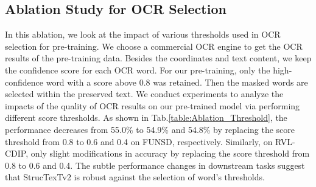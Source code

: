 \documentclass{article} \usepackage{iclr2023_conference,times}
\begin{document}
\begin{table}[ht]
\caption{Ablation study for Different Image Resolution.}
\label{table:Ablation_ImageResolution}
\vspace{-0.5em}
\begin{center}
\end{center}
\vspace{-0.5em}
\end{table}


\subsection{Ablation Study for OCR Selection}
In this ablation, we look at the impact of various thresholds used in OCR selection for pre-training. We choose a commercial OCR engine to get the OCR results of the pre-training data. Besides the coordinates and text content, we keep the confidence score for each OCR word. For our pre-training, only the high-confidence word with a score above 0.8 was retained. Then the masked words are selected within the preserved text. We conduct experiments to analyze the impacts of the quality of OCR results on our pre-trained model via performing different score thresholds. As shown in Tab.\ref{table:Ablation_Threshold}, the performance decreases from 55.0\% to 54.9\% and 54.8\% by replacing the score threshold from 0.8 to 0.6 and 0.4 on FUNSD, respectively. Similarly, on RVL-CDIP, only slight modifications in accuracy by replacing the score threshold from 0.8 to 0.6 and 0.4. The subtle performance changes in downstream tasks suggest that StrucTexTv2 is robust against the selection of word's thresholds.
\end{document}
